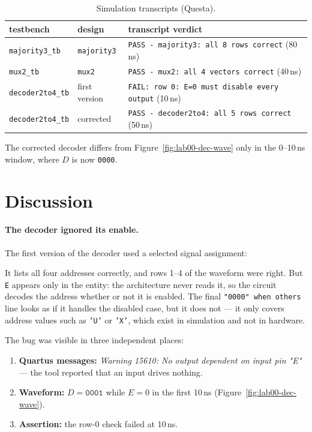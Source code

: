 \begin{table}[H]
\centering
\caption{Simulation transcripts (Questa).}
\label{tab:lab00-transcripts}
\begin{tabular}{lll}
\toprule
testbench & design & transcript verdict \\
\midrule
\texttt{majority3\_tb}   & \texttt{majority3}      & \texttt{PASS - majority3: all 8 rows correct} (80\,ns) \\
\texttt{mux2\_tb}        & \texttt{mux2}           & \texttt{PASS - mux2: all 4 vectors correct} (40\,ns) \\
\texttt{decoder2to4\_tb} & first version  & \texttt{FAIL: row 0: E=0 must disable every output} (10\,ns) \\
\texttt{decoder2to4\_tb} & corrected      & \texttt{PASS - decoder2to4: all 5 rows correct} (50\,ns) \\
\bottomrule
\end{tabular}
\end{table}

The corrected decoder differs from Figure~\ref{fig:lab00-dec-wave} only in the
0--10\,ns window, where $D$ is now \texttt{0000}.

\section{Discussion}
\label{sec:lab00-discussion}

\paragraph{The decoder ignored its enable.} The first version of the decoder used a
selected signal assignment:


It lists all four addresses correctly, and rows 1--4 of the waveform were right.
But \texttt{E} appears only in the entity: the architecture never reads it, so the
circuit decodes the address whether or not it is enabled. The final
\texttt{"0000" when others} line looks as if it handles the disabled case, but it
does not --- it only covers address values such as \texttt{'U'} or \texttt{'X'},
which exist in simulation and not in hardware.

The bug was visible in three independent places:
\begin{enumerate}[leftmargin=1.8em]
\item \textbf{Quartus messages:} \textit{Warning 15610: No output dependent on input
pin "E"} --- the tool reported that an input drives nothing.
\item \textbf{Waveform:} $D = \texttt{0001}$ while $E = 0$ in the first 10\,ns
(Figure~\ref{fig:lab00-dec-wave}).
\item \textbf{Assertion:} the row-0 check failed at 10\,ns.
\end{enumerate}

